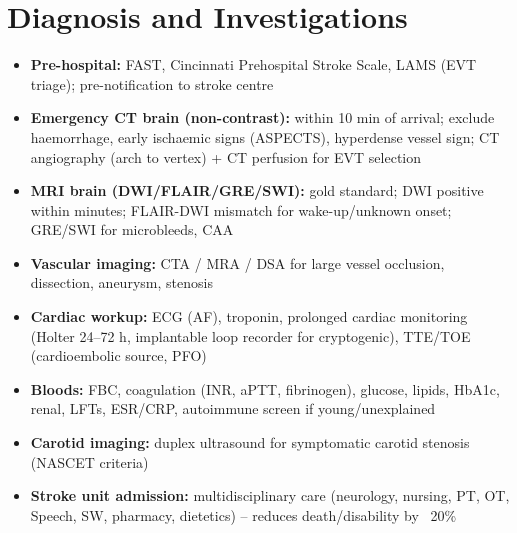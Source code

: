 \section*{Diagnosis and Investigations}
\begin{itemize}
    \item \textbf{Pre-hospital:} FAST, Cincinnati Prehospital Stroke Scale, LAMS (EVT triage); pre-notification to stroke centre
    \item \textbf{Emergency CT brain (non-contrast):} within 10 min of arrival; exclude haemorrhage, early ischaemic signs (ASPECTS), hyperdense vessel sign; CT angiography (arch to vertex) + CT perfusion for EVT selection
    \item \textbf{MRI brain (DWI/FLAIR/GRE/SWI):} gold standard; DWI positive within minutes; FLAIR-DWI mismatch for wake-up/unknown onset; GRE/SWI for microbleeds, CAA
    \item \textbf{Vascular imaging:} CTA / MRA / DSA for large vessel occlusion, dissection, aneurysm, stenosis
    \item \textbf{Cardiac workup:} ECG (AF), troponin, prolonged cardiac monitoring (Holter 24--72 h, implantable loop recorder for cryptogenic), TTE/TOE (cardioembolic source, PFO)
    \item \textbf{Bloods:} FBC, coagulation (INR, aPTT, fibrinogen), glucose, lipids, HbA1c, renal, LFTs, ESR/CRP, autoimmune screen if young/unexplained
    \item \textbf{Carotid imaging:} duplex ultrasound for symptomatic carotid stenosis (NASCET criteria)
    \item \textbf{Stroke unit admission:} multidisciplinary care (neurology, nursing, PT, OT, Speech, SW, pharmacy, dietetics) -- reduces death/disability by ~20\%
\end{itemize}

